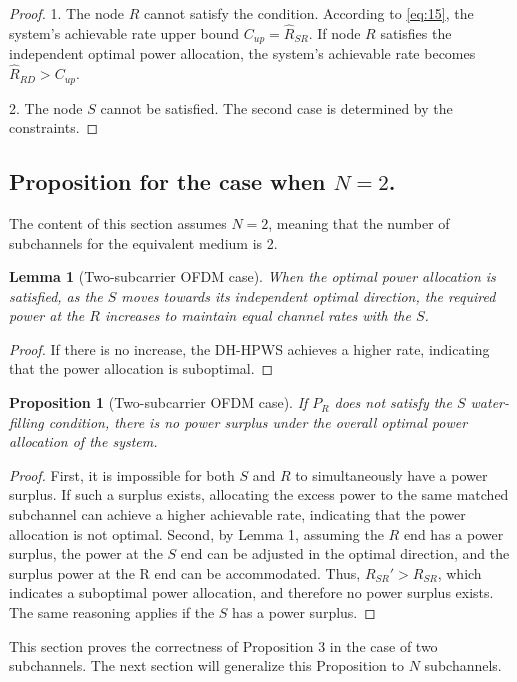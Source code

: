 \documentclass[lettersize,journal]{IEEEtran}
\newtheorem{proposition}{Proposition}
\newtheorem{lemma}{Lemma}  %
\begin{document}
	\begin{proof}
		
		1. The node \(R\) cannot satisfy the condition. According to \eqref{eq:15}, the system's achievable rate upper bound \({C_{up}} = \hat {R}_{SR}\). If node \(R\) satisfies the independent optimal power allocation, the system's achievable rate becomes \(\hat {R}_{RD} > {C_{up}}\).
		
		2. The  node \(S\) cannot be satisfied. The second case is determined by the constraints.
	\end{proof}	
	\subsection*{Proposition for the case when \( N = 2 \).}
	The content of this section assumes \( N = 2 \), meaning that the number of subchannels for the equivalent medium is 2.
	
	\begin{lemma}[Two-subcarrier OFDM case]
		When the optimal power allocation is satisfied, as the \(S\) moves towards its independent optimal direction, the required power at the \(R\) increases to maintain equal channel rates with the \(S\).
	\end{lemma}
	\begin{proof}
		If there is no increase, the DH-HPWS achieves a higher rate, indicating that the power allocation is suboptimal.
	\end{proof}	
	\begin{proposition}[Two-subcarrier OFDM case]
		 If \( P_R \) does not satisfy the \(S\) water-filling condition, there is no power surplus under the overall optimal power allocation of the system.
	\end{proposition}
	\begin{proof}
		First, it is impossible for both \(S\) and \(R\) to simultaneously have a power surplus. If such a surplus exists, allocating the excess power to the same matched subchannel can achieve a higher achievable rate, indicating that the power allocation is not optimal.  
		Second, by Lemma 1, assuming the \(R\) end has a power surplus, the power at the \(S\) end can be adjusted in the optimal direction, and the surplus power at the R end can be accommodated. Thus, \( R_{SR}' > R_{SR} \), which indicates a suboptimal power allocation, and therefore no power surplus exists. The same reasoning applies if the \(S\) has a power surplus.
	\end{proof}
	This section proves the correctness of Proposition 3 in the case of two subchannels. The next section will generalize this Proposition to \( N \) subchannels.
\end{document}
